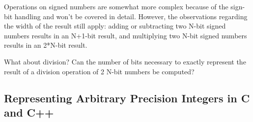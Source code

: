 Operations on signed numbers are somewhat more complex because of the sign-bit handling and won't be covered in detail.  However, the observations regarding the width of the result still apply: adding or subtracting two N-bit signed numbers results in an N+1-bit result, and multiplying two N-bit signed numbers results in an 2*N-bit result.

\begin{exercise}
What about division?  Can the number of bits necessary to exactly represent the result of a division operation of 2 N-bit numbers be computed?
\end{exercise}


\subsection{Representing Arbitrary Precision Integers in C and C++}
\label{sec:arbitrary_precision}

